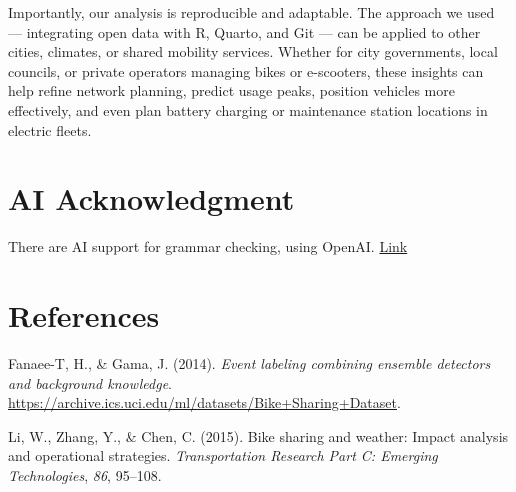 \documentclass[
  12pt,
]{article}
\newlength{\cslhangindent}
\newenvironment{CSLReferences}[2] %
 {\begin{list}{}{%
  \setlength{\itemindent}{0pt}
  \setlength{\leftmargin}{0pt}
  \setlength{\parsep}{0pt}
  \ifodd #1
   \setlength{\leftmargin}{\cslhangindent}
   \setlength{\itemindent}{-1\cslhangindent}
  \fi
  \setlength{\itemsep}{#2\baselineskip}}}
 {\end{list}}
\begin{document}
Importantly, our analysis is reproducible and adaptable. The approach we
used --- integrating open data with R, Quarto, and Git --- can be
applied to other cities, climates, or shared mobility services. Whether
for city governments, local councils, or private operators managing
bikes or e-scooters, these insights can help refine network planning,
predict usage peaks, position vehicles more effectively, and even plan
battery charging or maintenance station locations in electric fleets.

\section{AI Acknowledgment}\label{ai-acknowledgment}

There are AI support for grammar checking, using OpenAI.
\href{https://chatgpt.com/share/683412ac-5054-8002-8523-a5a1b400ef0a}{Link}

\section*{References}\label{references}

\label{refs}
\begin{CSLReferences}{1}{0}
Fanaee-T, H., \& Gama, J. (2014). \emph{Event labeling combining
ensemble detectors and background knowledge}.
\url{https://archive.ics.uci.edu/ml/datasets/Bike+Sharing+Dataset}.

Li, W., Zhang, Y., \& Chen, C. (2015). Bike sharing and weather: Impact
analysis and operational strategies. \emph{Transportation Research Part
C: Emerging Technologies}, \emph{86}, 95--108.

\end{CSLReferences}
\end{document}
